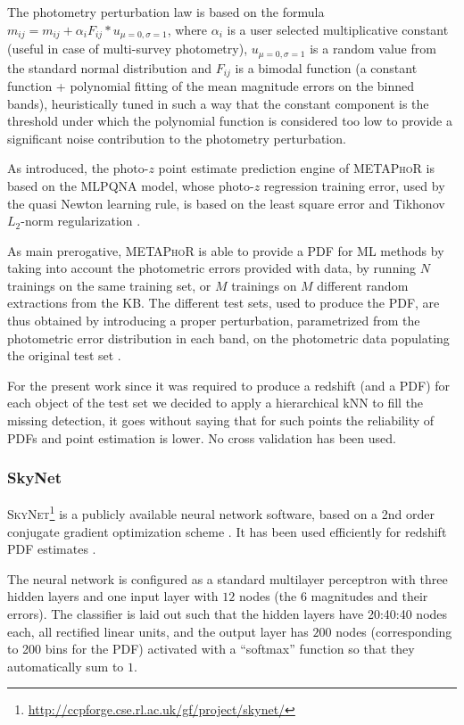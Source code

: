 \documentclass[usenatbib]{mn2e}
\begin{document}
The photometry perturbation law is based on the formula $m_{ij} = m_{ij} + \alpha_{i}F_{ij}*u_{\mu=0,\sigma=1}$, where $\alpha_{i}$ is a user selected multiplicative constant (useful in case of multi-survey photometry), $u_{\mu=0,\sigma=1}$ is a random value from the standard normal distribution and $F_{ij}$ is a bimodal function (a constant function + polynomial fitting of the mean magnitude errors on the binned bands), heuristically tuned in such a way that the constant component is the threshold under which the polynomial function is considered too low to provide a significant noise contribution to the photometry perturbation.

As introduced, the photo-$z$ point estimate prediction engine of \textsc{METAPhoR} is based on the MLPQNA model, whose photo-$z$ regression training error, used by the quasi Newton learning rule, is based on the least square error and Tikhonov $L_{2}$-norm regularization \citep{Hofmann:18}.

As main prerogative, \textsc{METAPhoR} is able to provide a PDF for ML methods by taking into account the photometric errors provided with data, by running $N$ trainings on the same training set, or $M$ trainings on $M$ different random extractions from the KB. The different test sets, used to produce the PDF, are thus obtained by introducing a proper perturbation, parametrized from the photometric error distribution in each band, on the photometric data populating the original test set \citep{Brescia:18}.

For the present work since it was required to produce a redshift (and a PDF) for each object of the test set we decided to apply a hierarchical kNN to fill the missing detection, it goes without saying that for such points the reliability of PDFs and point estimation is lower. No cross validation has been used.


\subsubsection{SkyNet}
\label{sec:skynet}

\textsc{SkyNet}\footnote{\url{http://ccpforge.cse.rl.ac.uk/gf/project/skynet/}} \citep{Graff:14} is a publicly available neural network software, based on a 2nd order conjugate gradient optimization scheme \citep[see][for further details]{Graff:14}. It has been used efficiently for redshift PDF estimates \citep{Sanchez:14,Bonnett:15,Bonnett:16}.

The neural network is configured as a standard multilayer perceptron with three hidden layers and one input layer with $12$ nodes (the $6$ magnitudes and their errors). 
The classifier is laid out such that the hidden layers have 20:40:40 nodes each, all rectified linear units, and the output layer has $200$ nodes (corresponding to 200 bins for the PDF) activated with a ``softmax'' function so that they automatically sum to $1$.
\end{document}
